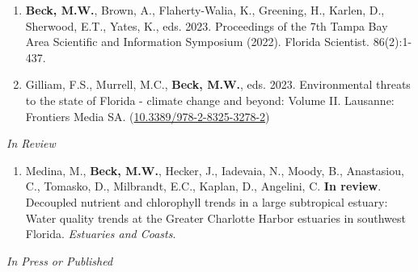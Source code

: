 \documentclass[letterpaper,12pt]{article}
\newcommand{\subsectitle}[1]{\vspace{\baselineskip} \centerline{\normalsize{\textit{#1}}}}
\begin{document}
\begin{enumerate}

\item \textbf{Beck, M.W.}, Brown, A., Flaherty-Walia, K., Greening, H., Karlen, D., Sherwood, E.T., Yates, K., eds. 2023. Proceedings of the 7th Tampa Bay Area Scientific and Information Symposium (2022). Florida Scientist. 86(2):1-437.

\item Gilliam, F.S., Murrell, M.C., \textbf{Beck, M.W.}, eds. 2023. Environmental threats to the state of Florida - climate change and beyond: Volume II. Lausanne: Frontiers Media SA. ({\footnotesize\href{https://doi.org/10.3389/978-2-8325-3278-2}{10.3389/978-2-8325-3278-2}}) 

\end{enumerate}

\subsectitle{In Review}

\begin{enumerate}

\item Medina, M., \textbf{Beck, M.W.}, Hecker, J., Iadevaia, N., Moody, B., Anastasiou, C., Tomasko, D., Milbrandt, E.C., Kaplan, D., Angelini, C. \textbf{In review}. Decoupled nutrient and chlorophyll trends in a large subtropical estuary: Water quality trends at the Greater Charlotte Harbor estuaries in southwest Florida. \textit{Estuaries and Coasts}.


\end{enumerate}

\subsectitle{In Press or Published}
\end{document}
